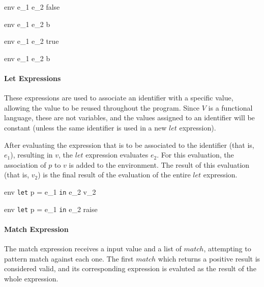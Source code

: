 \documentclass{article}
\begin{document}
    {\mbox{env} \vdash e_1 \; e_2 \Downarrow false}

    {\mbox{env} \vdash e_1 \; e_2 \Downarrow b}

    {\mbox{env} \vdash e_1 \; e_2 \Downarrow true}

    {\mbox{env} \vdash e_1 \; e_2 \Downarrow b}

\paragraph{Let Expressions}
These expressions are used to associate an identifier with a specific value, allowing the value to be reused throughout the program.
Since $V$ is a functional language, these are not variables, and the values assigned to an identifier will be constant (unless the same identifier is used in a new $let$ expression).

After evaluating the expression that is to be associated to the identifier (that is, $e_1$), resulting in $v$, the $let$ expression evaluates $e_2$.
For this evaluation, the association of $p$ to $v$ is added to the environment.
The result of this evaluation (that is, $v_2$) is the final result of the evaluation of the entire $let$ expression.

    {\mbox{env} \vdash \texttt{let} \; p = e_1 \; \texttt{in} \; e_2 \Downarrow v_2}

    {\mbox{env} \vdash \texttt{let} \; p = e_1 \; \texttt{in} \; e_2 \Downarrow raise}

\bigskip

\paragraph{Match Expression}

The match expression receives a input value and a list of $match$, attempting to pattern match against each one.
The first $match$ which returns a positive result is considered valid, and its corresponding expression is evaluted as the result of the whole expression.
\end{document}
